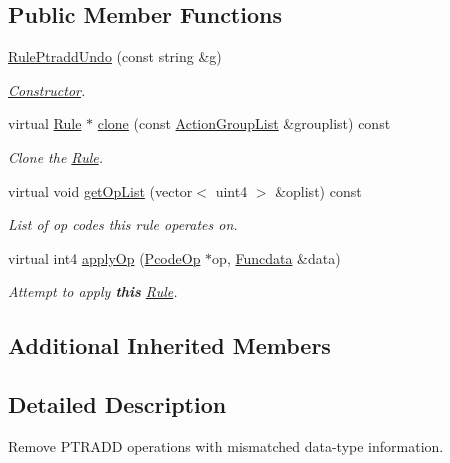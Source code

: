 \subsection*{Public Member Functions}
\begin{DoxyCompactItemize}
\item 
\mbox{\hyperlink{class_rule_ptradd_undo_a14cf0cd1747af7cef5ab4bf62b1c75c8}{Rule\+Ptradd\+Undo}} (const string \&g)
\begin{DoxyCompactList}\small\item\em \mbox{\hyperlink{class_constructor}{Constructor}}. \end{DoxyCompactList}\item 
virtual \mbox{\hyperlink{class_rule}{Rule}} $\ast$ \mbox{\hyperlink{class_rule_ptradd_undo_a1838c48328cbd127036ec498a66d8989}{clone}} (const \mbox{\hyperlink{class_action_group_list}{Action\+Group\+List}} \&grouplist) const
\begin{DoxyCompactList}\small\item\em Clone the \mbox{\hyperlink{class_rule}{Rule}}. \end{DoxyCompactList}\item 
virtual void \mbox{\hyperlink{class_rule_ptradd_undo_a49b2fbf377a4e588627ec1fe6ccecc95}{get\+Op\+List}} (vector$<$ uint4 $>$ \&oplist) const
\begin{DoxyCompactList}\small\item\em List of op codes this rule operates on. \end{DoxyCompactList}\item 
virtual int4 \mbox{\hyperlink{class_rule_ptradd_undo_afc408fd7b407b90b30b2d039e6a1ed14}{apply\+Op}} (\mbox{\hyperlink{class_pcode_op}{Pcode\+Op}} $\ast$op, \mbox{\hyperlink{class_funcdata}{Funcdata}} \&data)
\begin{DoxyCompactList}\small\item\em Attempt to apply {\bfseries{this}} \mbox{\hyperlink{class_rule}{Rule}}. \end{DoxyCompactList}\end{DoxyCompactItemize}
\subsection*{Additional Inherited Members}


\subsection{Detailed Description}
Remove P\+T\+R\+A\+DD operations with mismatched data-\/type information. 

